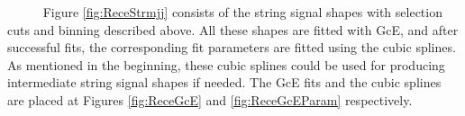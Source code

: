 ~~~~~ Figure \ref{fig:ReceStrmjj} consists of the string signal shapes with selection cuts and binning described above. All these shapes are fitted with GcE, and after successful fits, the corresponding fit parameters are fitted using the cubic splines. As mentioned in the beginning, these cubic splines could be used for producing intermediate string signal shapes if needed. The GcE fits and the cubic splines are placed at Figures \ref{fig:ReceGcE} and \ref{fig:ReceGcEParam} respectively. 

\clearpage

\begin{figure}[!htb]
  \centering

\end{figure}
